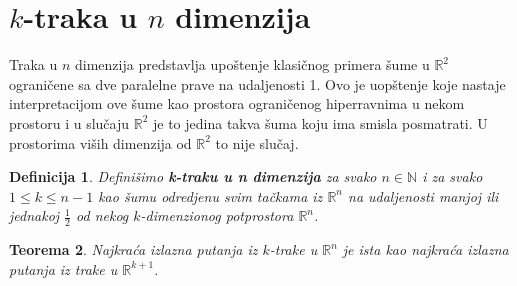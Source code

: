 \documentclass[11pt,letter]{article}
\newtheorem{teo}{\bf Teorema}[section]
\newtheorem{df}[teo]{\bf Definicija}
\begin{document}
\section[$k$-traka u $n$ dimenzija]{$k$-traka u $n$ dimenzija}
\bigskip
\indent Traka u $n$ dimenzija predstavlja upo\v stenje klasi\v cnog primera \v sume u $\mathbb{R}^2$ ograni\v cene sa dve paralelne prave na udaljenosti 1. Ovo je uop\v stenje koje nastaje interpretacijom ove \v sume kao prostora ograni\v cenog hiperravnima u nekom prostoru i u slu\v caju $\mathbb{R}^2$ je to jedina takva \v suma koju ima smisla posmatrati. U prostorima vi\v sih dimenzija od $\mathbb{R}^2$ to nije slu\v caj.
\\
\begin{df} Defini\v simo \textbf{k-traku u n dimenzija} za svako $n\in \mathbb{N}$ i za svako $1\leqslant k\leqslant n-1$  kao \v sumu odredjenu svim ta\v ckama iz $\mathbb{R}^n$ na udaljenosti manjoj ili jednakoj $\frac{1}{2}$ od nekog $k$-dimenzionog potprostora $\mathbb{R}^n$. 
\end{df}
\begin{teo} Najkra\' ca izlazna putanja iz $k$-trake u $\mathbb{R}^n$ je ista kao najkra\' ca izlazna putanja iz trake u $\mathbb{R}^{k+1}$.\end{teo}
\end{document}
